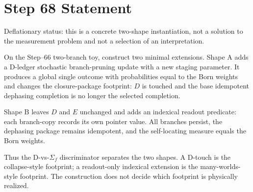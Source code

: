 \documentclass[11pt]{article}
\begin{document}
\section*{Step 68 Statement}
Deflationary status: this is a concrete two-shape instantiation, not a solution to the measurement problem and not a selection of an interpretation.

On the Step--66 two-branch toy, construct two minimal extensions. Shape A adds a D-ledger stochastic branch-pruning update with a new staging parameter. It produces a global single outcome with probabilities equal to the Born weights and changes the closure-package footprint: \(D\) is touched and the base idempotent dephasing completion is no longer the selected completion.

Shape B leaves \(D\) and \(E\) unchanged and adds an indexical readout predicate: each branch-copy records its own pointer value. All branches persist, the dephasing package remains idempotent, and the self-locating measure equals the Born weights.

Thus the D-vs-\(\Sigma_f\) discriminator separates the two shapes. A D-touch is the collapse-style footprint; a readout-only indexical extension is the many-worlds-style footprint. The construction does not decide which footprint is physically realized.
\end{document}
